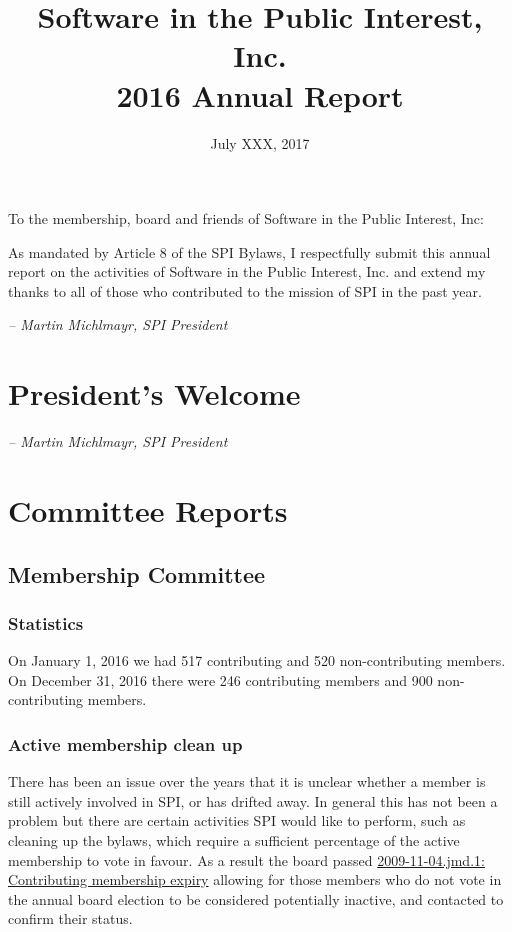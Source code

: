 \documentclass[letterpaper]{report}
\begin{document}
\title{Software in the Public Interest, Inc.\\
2016 Annual Report}
\date{July XXX, 2017}

\maketitle

To the membership, board and friends of Software in the Public Interest, Inc:

As mandated by Article 8 of the SPI Bylaws, I respectfully submit this annual
report on the activities of Software in the Public Interest, Inc. and extend my
thanks to all of those who contributed to the mission of SPI in the past year.

  \emph{-- Martin Michlmayr, SPI President}

\newpage

\tableofcontents

\newpage

\chapter{President's Welcome}
\label{sec:president}

  \emph{-- Martin Michlmayr, SPI President}

\chapter{Committee Reports}
\section{Membership Committee}

\subsection{Statistics}

On January 1, 2016 we had 517 contributing and 520 non-contributing members.
On December 31, 2016 there were 246 contributing members and 900 non-contributing
members.

\subsection{Active membership clean up}

There has been an issue over the years that it is unclear whether a member is still actively involved in SPI, or has drifted away. In general this has not been a problem but there are certain activities SPI would like to perform, such as cleaning up the bylaws, which require a sufficient percentage of the active membership to vote in favour. As a result the board passed \href{http://spi-inc.org/corporate/resolutions/2009/2009-11-04.jmd.1/}{2009-11-04.jmd.1: Contributing membership expiry} allowing for those members who do not vote in the annual board election to be considered potentially inactive, and contacted to confirm their status.
\end{document}
